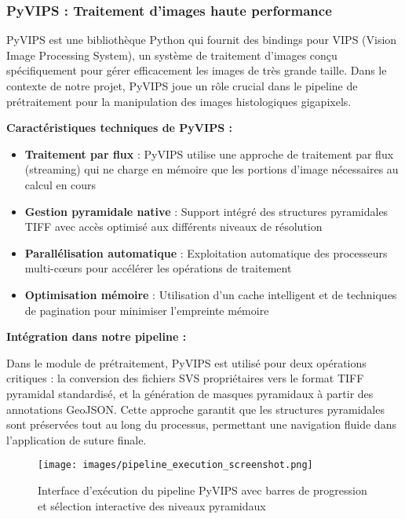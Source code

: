 \subsubsection{PyVIPS : Traitement d'images haute performance}

PyVIPS est une bibliothèque Python qui fournit des bindings pour VIPS (Vision Image Processing System), un système de traitement d'images conçu spécifiquement pour gérer efficacement les images de très grande taille. Dans le contexte de notre projet, PyVIPS joue un rôle crucial dans le pipeline de prétraitement pour la manipulation des images histologiques gigapixels.

\textbf{Caractéristiques techniques de PyVIPS :}

\begin{itemize}[leftmargin=*]
    \item \textbf{Traitement par flux} : PyVIPS utilise une approche de traitement par flux (streaming) qui ne charge en mémoire que les portions d'image nécessaires au calcul en cours
    \item \textbf{Gestion pyramidale native} : Support intégré des structures pyramidales TIFF avec accès optimisé aux différents niveaux de résolution
    \item \textbf{Parallélisation automatique} : Exploitation automatique des processeurs multi-cœurs pour accélérer les opérations de traitement
    \item \textbf{Optimisation mémoire} : Utilisation d'un cache intelligent et de techniques de pagination pour minimiser l'empreinte mémoire
\end{itemize}

\textbf{Intégration dans notre pipeline :}

Dans le module de prétraitement, PyVIPS est utilisé pour deux opérations critiques : la conversion des fichiers SVS propriétaires vers le format TIFF pyramidal standardisé, et la génération de masques pyramidaux à partir des annotations GeoJSON. Cette approche garantit que les structures pyramidales sont préservées tout au long du processus, permettant une navigation fluide dans l'application de suture finale.

\begin{figure}[H]
\centering
\texttt{[image: images/pipeline\_execution\_screenshot.png]}
\caption{Interface d'exécution du pipeline PyVIPS avec barres de progression et sélection interactive des niveaux pyramidaux}
\label{fig:pyvips_pipeline}
\end{figure}

